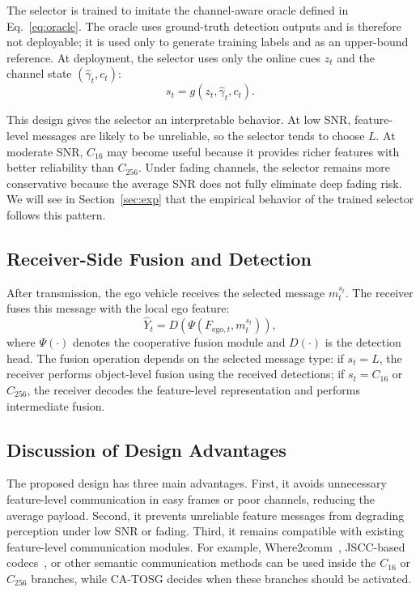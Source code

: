 \documentclass[journal]{IEEEtran}
\newcommand{\method}{CA-TOSG}
\begin{document}
The selector is trained to imitate the channel-aware oracle defined in Eq.~\eqref{eq:oracle}. The oracle uses ground-truth detection outputs and is therefore not deployable; it is used only to generate training labels and as an upper-bound reference. At deployment, the selector uses only the online cues $z_t$ and the channel state $(\hat\gamma_t,c_t)$:
\begin{equation}
s_t = g(z_t,\hat\gamma_t,c_t).
\end{equation}

This design gives the selector an interpretable behavior. At low SNR, feature-level messages are likely to be unreliable, so the selector tends to choose $L$. At moderate SNR, $C_{16}$ may become useful because it provides richer features with better reliability than $C_{256}$. Under fading channels, the selector remains more conservative because the average SNR does not fully eliminate deep fading risk. We will see in Section~\ref{sec:exp} that the empirical behavior of the trained selector follows this pattern.

\subsection{Receiver-Side Fusion and Detection}

After transmission, the ego vehicle receives the selected message $m_t^{s_t}$. The receiver fuses this message with the local ego feature:
\begin{equation}
\hat{Y}_t = D\left( \Psi(F_{\mathrm{ego},t}, m_t^{s_t}) \right),
\end{equation}
where $\Psi(\cdot)$ denotes the cooperative fusion module and $D(\cdot)$ is the detection head. The fusion operation depends on the selected message type: if $s_t=L$, the receiver performs object-level fusion using the received detections; if $s_t=C_{16}$ or $C_{256}$, the receiver decodes the feature-level representation and performs intermediate fusion.

\subsection{Discussion of Design Advantages}

The proposed design has three main advantages. First, it avoids unnecessary feature-level communication in easy frames or poor channels, reducing the average payload. Second, it prevents unreliable feature messages from degrading perception under low SNR or fading. Third, it remains compatible with existing feature-level communication modules. For example, Where2comm~\cite{hu2022where2comm}, JSCC-based codecs~\cite{sheng2024importance}, or other semantic communication methods can be used inside the $C_{16}$ or $C_{256}$ branches, while \method{} decides when these branches should be activated.
\end{document}
